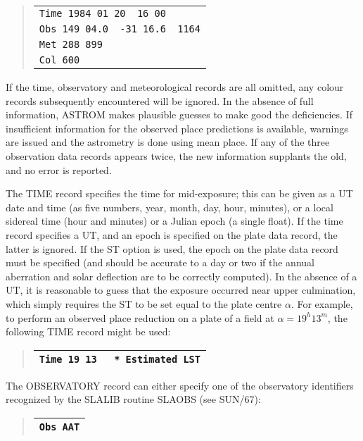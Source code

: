 \documentclass[twoside,11pt]{article}
\newcommand{\xref}[3]{#1}
\renewcommand{\_}{\texttt{\symbol{95}}}
\begin{document}
\begin{quote}
\begin{tabular}{|l|}
\hline
\verb|Time 1984 01 20  16 00| \\
\verb|Obs 149 04.0  -31 16.6  1164| \\
\verb|Met 288 899| \\
\verb|Col 600| \\
\hline
\end{tabular}
\end{quote}

If the time, observatory and meteorological records are all omitted,
any colour records subsequently encountered will be ignored.  In the
absence of full information, ASTROM makes plausible guesses to make good
the deficiencies.  If insufficient information for the observed place
predictions is available, warnings are issued and the astrometry is done
using mean place.  If any of the three observation data records appears
twice, the new information supplants the old, and no error is reported.

The TIME record specifies the time for mid-exposure; this can be
given as a UT date and time (as five numbers, year, month, day, hour,
minutes), or a local sidereal time (hour and minutes) or a Julian epoch
(a single float).  If the time record specifies
a UT, and an epoch is specified on the plate data record, the latter is
ignored.  If the ST option is used, the epoch on the plate data record
must be specified (and should be accurate to a day or two if the annual
aberration and solar deflection are to be correctly computed).  In the
absence of a UT, it is reasonable to guess that the exposure occurred
near upper culmination, which simply requires the ST to be set equal to
the plate centre $\alpha$.  For example, to perform an observed place
reduction on a plate of a field at $\alpha=19^{h}13^{m}$, the following
TIME record might be used:

\begin{quote}
\begin{tabular}{|l|}
\hline
\verb|Time 19 13   * Estimated LST| \\
\hline
\end{tabular}
\end{quote}

The OBSERVATORY record can either specify one of the observatory
identifiers recognized by the \xref{SLALIB}{sun67}{} routine
\xref{SLA\_OBS}{sun67}{SLA_OBS} (see SUN/67):

\begin{quote}
\begin{tabular}{|l|}
\hline
\verb|Obs AAT| \\
\hline
\end{tabular}
\end{quote}
\end{document}
